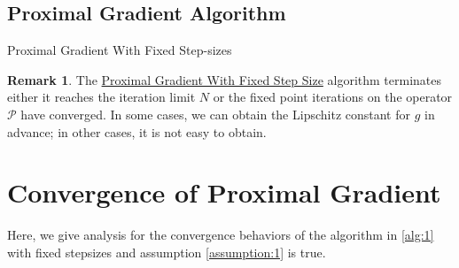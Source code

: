 \documentclass[]{article}
\theoremstyle{definition}
\newtheorem{remark}{Remark}[subsection]
{
    \newtheorem{assumption}{Assumption}
}
\begin{document}
    \subsection{Proximal Gradient Algorithm}
        \begin{algorithm}[H]
            \begin{algorithmic}[1]
                \ENDIF
            \ENDFOR
            \end{algorithmic}
            \caption{Proximal Gradient With Fixed Step-sizes}
            \label{alg:1}
        \end{algorithm}
        \begin{remark}
            The \hyperref[alg:1]{Proximal Gradient With Fixed Step Size} algorithm terminates either it reaches the iteration limit $N$ or the fixed point iterations on the operator $\mathcal P$ have converged. In some cases, we can obtain the Lipschitz constant for $g$ in advance; in other cases, it is not easy to obtain. 
        \end{remark}

\section{Convergence of Proximal Gradient}\label{sec:pg_convergence}
    Here, we give analysis for the convergence behaviors of the algorithm in \hyperref[alg:1]{\ref*{alg:1}} with fixed stepsizes and assumption \hyperref[assumption:1]{\ref*{assumption:1}} is true. 
\end{document}
